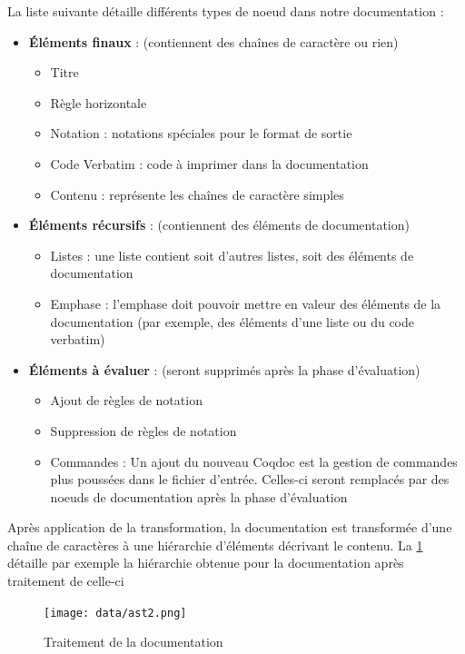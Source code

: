 \documentclass[a4paper, 11pt]{report}
\begin{document}
    La liste suivante détaille différents types de noeud dans notre
    documentation :
    \begin{itemize}
      \item \textbf{Éléments finaux} : (contiennent des chaînes de caractère ou rien)
        \begin{itemize}
            \item Titre
            \item Règle horizontale
            \item Notation : notations spéciales pour le format de sortie
            \item Code Verbatim : code à imprimer dans la documentation
            \item Contenu : représente les chaînes de caractère simples
        \end{itemize}
      \item \textbf{Éléments récursifs} : (contiennent des éléments de documentation)
        \begin{itemize}
          \item Listes : une liste contient soit d'autres listes, soit des
                éléments de documentation
          \item Emphase : l'emphase doit pouvoir mettre en valeur des éléments
                de la documentation (par exemple, des éléments d'une liste ou
                du code verbatim)
        \end{itemize}
      \item \textbf{Éléments à évaluer} : (seront supprimés après la phase d'évaluation)
        \begin{itemize}
          \item Ajout de règles de notation
          \item Suppression de règles de notation
          \item Commandes : Un ajout du nouveau Coqdoc est la gestion de
                commandes plus poussées dans le fichier d'entrée. Celles-ci
                seront remplacés par des noeuds de documentation après la
                phase d'évaluation
        \end{itemize}
    \end{itemize}
    Après application de la transformation, la documentation est transformée
    d'une chaîne de caractères à une hiérarchie d'éléments décrivant le contenu.
    La \cref{ast2} détaille par exemple la hiérarchie obtenue pour la
   documentation après traitement de celle-ci
    \begin{figure}
      \texttt{[image: data/ast2.png]}
      \caption{Traitement de la documentation}
      \label{ast2}
    \end{figure}
\end{document}
